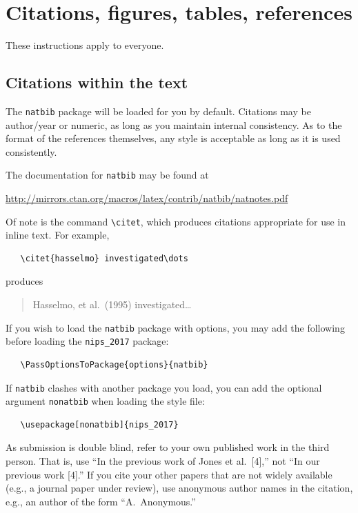 \documentclass{article}
\begin{document}
\section{Citations, figures, tables, references}
\label{others}

These instructions apply to everyone.

\subsection{Citations within the text}

The \verb+natbib+ package will be loaded for you by default.
Citations may be author/year or numeric, as long as you maintain
internal consistency.  As to the format of the references themselves,
any style is acceptable as long as it is used consistently.

The documentation for \verb+natbib+ may be found at
\begin{center}
  \url{http://mirrors.ctan.org/macros/latex/contrib/natbib/natnotes.pdf}
\end{center}
Of note is the command \verb+\citet+, which produces citations
appropriate for use in inline text.  For example,
\begin{verbatim}
   \citet{hasselmo} investigated\dots
\end{verbatim}
produces
\begin{quote}
  Hasselmo, et al.\ (1995) investigated\dots
\end{quote}

If you wish to load the \verb+natbib+ package with options, you may
add the following before loading the \verb+nips_2017+ package:
\begin{verbatim}
   \PassOptionsToPackage{options}{natbib}
\end{verbatim}

If \verb+natbib+ clashes with another package you load, you can add
the optional argument \verb+nonatbib+ when loading the style file:
\begin{verbatim}
   \usepackage[nonatbib]{nips_2017}
\end{verbatim}

As submission is double blind, refer to your own published work in the
third person. That is, use ``In the previous work of Jones et
al.\ [4],'' not ``In our previous work [4].'' If you cite your other
papers that are not widely available (e.g., a journal paper under
review), use anonymous author names in the citation, e.g., an author
of the form ``A.\ Anonymous.''
\end{document}
